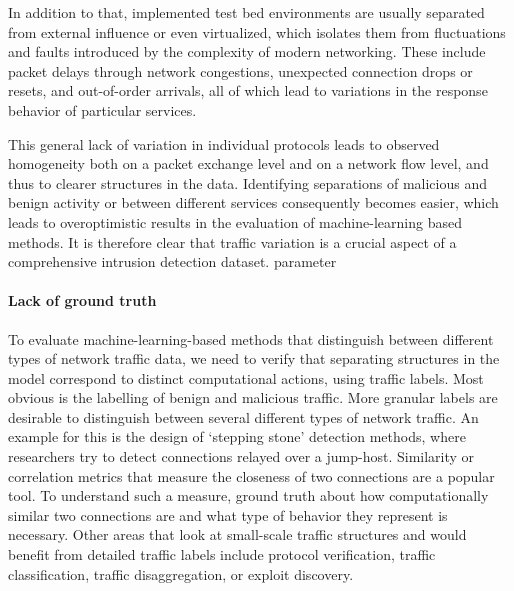 In addition to that, implemented test bed environments are usually separated from external influence or even virtualized, which isolates them from fluctuations and faults introduced by the complexity of modern networking. These include packet delays through network congestions, unexpected connection drops or resets, and out-of-order arrivals, all of which lead to variations in the response behavior of particular services.

This general lack of variation in individual protocols leads to observed homogeneity both on a packet exchange level and on a network flow level, and thus to clearer structures in the data. Identifying separations of malicious and benign activity or between different services consequently becomes easier, which leads to overoptimistic results in the evaluation of machine-learning based methods. It is therefore clear that traffic variation is a crucial aspect of a comprehensive intrusion detection dataset.
parameter

\paragraph*{Lack of ground truth}

To evaluate machine-learning-based methods that distinguish between different types of network traffic data, we need to verify that separating structures in the model correspond to distinct computational actions, using traffic labels. Most obvious is the labelling of benign and malicious traffic. More granular labels are desirable to distinguish between several different types of network traffic. An example for this is the design of `stepping stone' detection methods, where researchers try to detect connections relayed over a jump-host. Similarity or correlation metrics that measure the closeness of two connections are a popular tool. To understand such a measure, ground truth about how computationally similar two connections are and what type of behavior they represent is necessary. 
Other areas that look at small-scale traffic structures and would benefit from detailed traffic labels include protocol verification, traffic classification, traffic disaggregation, or exploit discovery.

